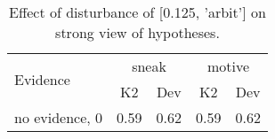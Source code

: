 \begin{table}\begin{tabular}{l|cc|cc}\toprule\multirow{2}{*}{Evidence} & \multicolumn{2}{c}{sneak}& \multicolumn{2}{c}{motive}\\& {K2} & {Dev}& {K2} & {Dev}\\\midrule
no evidence, 0 & 0.59&0.62&0.59&0.62\\\bottomrule\end{tabular}\caption{Effect of disturbance of [0.125, 'arbit'] on strong view of hypotheses.}\end{table}